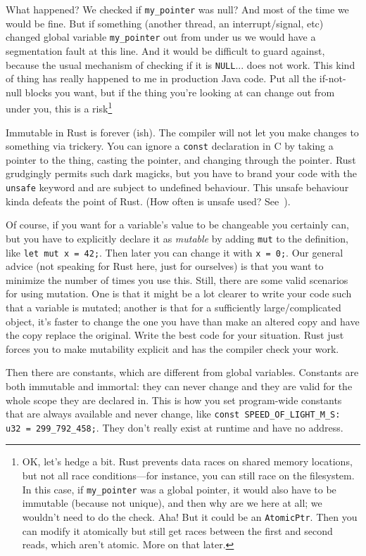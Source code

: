 \documentclass[a4paper]{report}
\begin{document}
What happened? We checked if \texttt{my\_pointer} was null? And most of the time we would be fine. But if something (another thread, an interrupt/signal, etc) changed global variable \texttt{my\_pointer} out from under us we would have a segmentation fault at this line. And it would be difficult to guard against, because the usual mechanism of checking if it is \texttt{NULL}... does not work. This kind of thing has really happened to me in production Java code. Put all the if-not-null blocks you want, but if the thing you're looking at can change out from under you, this is a risk\footnote{OK, let's hedge a bit. Rust prevents data races on shared memory locations, but not all race conditions---for instance, you can still race on the filesystem. In this case, if \texttt{my\_pointer} was a global pointer, it would also have to be immutable (because not unique), and then why are we here at all; we wouldn't need to do the check. Aha! But it could be an \texttt{AtomicPtr}. Then you can modify it atomically but still get races between the first and second reads, which aren't atomic. More on that later.}

Immutable in Rust is forever (ish). The compiler will not let you make changes to something via trickery. You can ignore a \texttt{const} declaration in C by taking a pointer to the thing, casting the pointer, and changing through the pointer. Rust grudgingly permits such dark magicks, but you have to brand your code with the \texttt{unsafe} keyword and are subject to undefined behaviour. This unsafe behaviour kinda defeats the point of Rust. (How often is unsafe used? See~\cite{astrauskas20:_how_progr_unsaf_rust}).

Of course, if you want for a variable's value to be changeable you certainly can, but you have to explicitly declare it as \textit{mutable} by adding \texttt{mut} to the definition, like \texttt{let mut x = 42;}. Then later you can change it with \texttt{x = 0;}. Our general advice (not speaking for Rust here, just for ourselves) is that you want to minimize the number of times you use this. Still, there are some valid scenarios for using mutation. One is that it might be a lot clearer to write your code such that a variable is mutated; another is that for a sufficiently large/complicated object, it's faster to change the one you have than make an altered copy and have the copy replace the original. Write the best code for your situation. Rust just forces you to make mutability explicit and has the compiler check your work.

Then there are constants, which are different from global variables. Constants are both immutable and immortal: they can never change and they are valid for the whole scope they are declared in. This is how you set program-wide constants that are always available and never change, like \texttt{const SPEED\_OF\_LIGHT\_M\_S: u32 = 299\_792\_458;}. They don't really exist at runtime and have no address.
\end{document}
